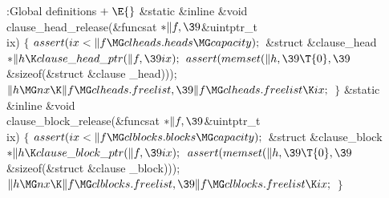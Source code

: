 \Y\B\4:Global definitions\X${}\mathrel+\E{}$\6
\&{static} \&{inline} \&{void} \\{clause\_head\_release}(\&{funcsat} ${}{*}\|f,%
\39{}$\&{uintptr\_t} \\{ix})\1\1\2\2\6
${}\{{}$\1\6
${}\\{assert}(\\{ix}<\|f\MG\\{clheads}.\\{heads}\MG\\{capacity});{}$\7
\&{struct} \&{clause\_head} ${}{*}\|h\K\\{clause\_head\_ptr}(\|f,\39\\{ix});{}$%
\7
${}\\{assert}(\\{memset}(\|h,\39\T{0},\39{}$\&{sizeof}(\&{struct} \&{clause%
\_head})));\6
${}\|h\MG\\{nx}\K\|f\MG\\{clheads}.\\{freelist},\39\|f\MG\\{clheads}.%
\\{freelist}\K\\{ix};{}$\6
\4${}\}{}$\2\7
\&{static} \&{inline} \&{void} \\{clause\_block\_release}(\&{funcsat} ${}{*}%
\|f,\39{}$\&{uintptr\_t} \\{ix})\1\1\2\2\6
${}\{{}$\1\6
${}\\{assert}(\\{ix}<\|f\MG\\{clblocks}.\\{blocks}\MG\\{capacity});{}$\7
\&{struct} \&{clause\_block} ${}{*}\|h\K\\{clause\_block\_ptr}(\|f,\39%
\\{ix});{}$\7
${}\\{assert}(\\{memset}(\|h,\39\T{0},\39{}$\&{sizeof}(\&{struct} \&{clause%
\_block})));\6
${}\|h\MG\\{nx}\K\|f\MG\\{clblocks}.\\{freelist},\39\|f\MG\\{clblocks}.%
\\{freelist}\K\\{ix};{}$\6
\4${}\}{}$\2\par
\fi

